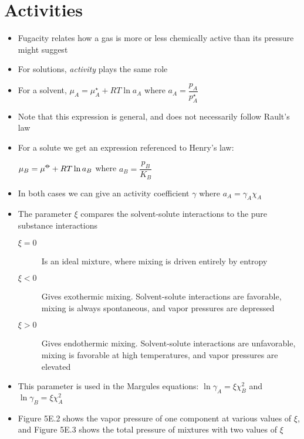 \documentclass[12pt, openany, letterpaper]{memoir}
\begin{document}
\section{Activities}
\begin{itemize}
	\item Fugacity relates how a gas is more or less chemically active than its pressure might suggest
	\item For solutions, \emph{activity} plays the same role
	\item For a solvent, $\mu_A = \mu^\star_A + RT\ln a_A$ where $a_A=\dfrac{p_A}{p^\star_A}$
	\item Note that this expression is general, and does not necessarily follow Rault's law
	\item For a solute we get an expression referenced to Henry's law:
	
	$\mu_B=\mu^{\std}+RT\ln a_B$ where $a_B=\dfrac{p_B}{K_B}$
	\item In both cases we can give an activity coefficient $\gamma$ where $a_A=\gamma_A\chi_A$
	\item The parameter $\xi$ compares the solvent-solute interactions to the pure substance interactions
	\begin{description}
		\item[$\xi=0$] Is an ideal mixture, where mixing is driven entirely by entropy
		\item[$\xi<0$] Gives exothermic mixing. Solvent-solute interactions are favorable, mixing is always spontaneous, and vapor pressures are depressed
		\item[$\xi>0$] Gives endothermic mixing. Solvent-solute interactions are unfavorable, mixing is favorable at high temperatures, and vapor pressures are elevated
	\end{description}
	\item This parameter is used in the Margules equations: $\ln\gamma_A = \xi\chi_B^2$ and $\ln\gamma_B=\xi\chi_A^2$
	\item Figure 5E.2 shows the vapor pressure of one component at various values of $\xi$, and Figure 5E.3 shows the total pressure of mixtures with two values of $\xi$	
\end{itemize}
\end{document}
